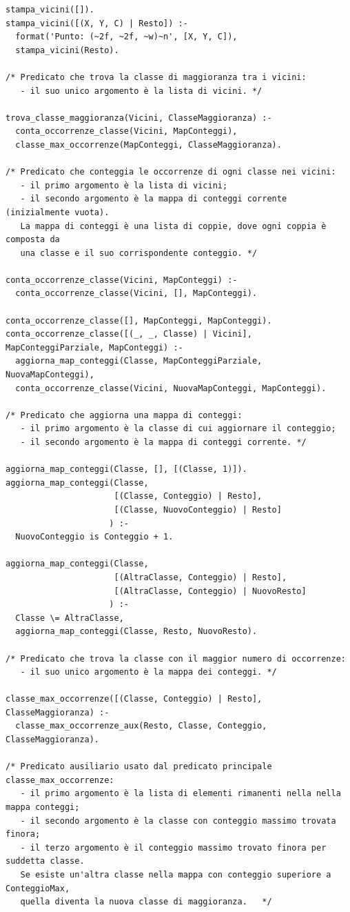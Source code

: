 \documentclass[11pt]{article}
\theoremstyle{definition}
\begin{document}
\begin{verbatim}
stampa_vicini([]).
stampa_vicini([(X, Y, C) | Resto]) :-
  format('Punto: (~2f, ~2f, ~w)~n', [X, Y, C]),
  stampa_vicini(Resto).
  
/* Predicato che trova la classe di maggioranza tra i vicini:
   - il suo unico argomento è la lista di vicini. */

trova_classe_maggioranza(Vicini, ClasseMaggioranza) :-
  conta_occorrenze_classe(Vicini, MapConteggi),
  classe_max_occorrenze(MapConteggi, ClasseMaggioranza).

/* Predicato che conteggia le occorrenze di ogni classe nei vicini: 
   - il primo argomento è la lista di vicini;
   - il secondo argomento è la mappa di conteggi corrente (inizialmente vuota).
   La mappa di conteggi è una lista di coppie, dove ogni coppia è composta da
   una classe e il suo corrispondente conteggio. */

conta_occorrenze_classe(Vicini, MapConteggi) :-
  conta_occorrenze_classe(Vicini, [], MapConteggi).
  
conta_occorrenze_classe([], MapConteggi, MapConteggi).
conta_occorrenze_classe([(_, _, Classe) | Vicini], MapConteggiParziale, MapConteggi) :-
  aggiorna_map_conteggi(Classe, MapConteggiParziale, NuovaMapConteggi),
  conta_occorrenze_classe(Vicini, NuovaMapConteggi, MapConteggi).

/* Predicato che aggiorna una mappa di conteggi:
   - il primo argomento è la classe di cui aggiornare il conteggio;
   - il secondo argomento è la mappa di conteggi corrente. */

aggiorna_map_conteggi(Classe, [], [(Classe, 1)]).
aggiorna_map_conteggi(Classe, 
                      [(Classe, Conteggio) | Resto], 
                      [(Classe, NuovoConteggio) | Resto]
                     ) :-
  NuovoConteggio is Conteggio + 1.

aggiorna_map_conteggi(Classe, 
                      [(AltraClasse, Conteggio) | Resto], 
                      [(AltraClasse, Conteggio) | NuovoResto]
                     ) :-
  Classe \= AltraClasse,
  aggiorna_map_conteggi(Classe, Resto, NuovoResto).

/* Predicato che trova la classe con il maggior numero di occorrenze:
   - il suo unico argomento è la mappa dei conteggi. */
   
classe_max_occorrenze([(Classe, Conteggio) | Resto], ClasseMaggioranza) :-
  classe_max_occorrenze_aux(Resto, Classe, Conteggio, ClasseMaggioranza).

/* Predicato ausiliario usato dal predicato principale classe_max_occorrenze:
   - il primo argomento è la lista di elementi rimanenti nella nella mappa conteggi;
   - il secondo argomento è la classe con conteggio massimo trovata finora;
   - il terzo argomento è il conteggio massimo trovato finora per suddetta classe. 
   Se esiste un'altra classe nella mappa con conteggio superiore a ConteggioMax, 
   quella diventa la nuova classe di maggioranza.   */


\end{verbatim}
\end{document}
